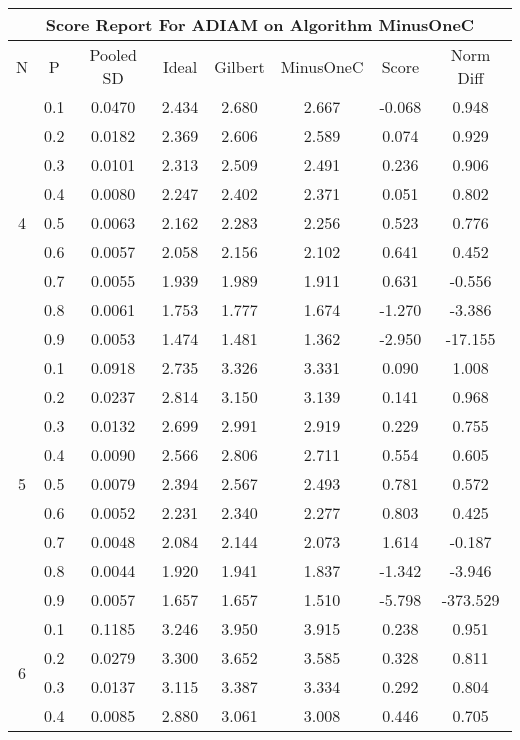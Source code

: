 \documentclass[11pt,a4paper]{report}
\begin{document}
\begin{longtable}{ | c | c || c | c | c | c | c | c | }
\hline
\multicolumn{8}{|c|}{ Score Report For ADIAM on Algorithm MinusOneC} \\
\hline
N & P & Pooled SD &  Ideal &  Gilbert & MinusOneC  & Score & Norm Diff \\
 \hline
 \hline
 \endhead
\multirow{9}{*}{4} & 0.1 & 0.0470 & 2.434 & 2.680 & 2.667 & -0.068 & 0.948 \\
 & 0.2 & 0.0182 & 2.369 & 2.606 & 2.589 & 0.074 & 0.929 \\
 & 0.3 & 0.0101 & 2.313 & 2.509 & 2.491 & 0.236 & 0.906 \\
 & 0.4 & 0.0080 & 2.247 & 2.402 & 2.371 & 0.051 & 0.802 \\
 & 0.5 & 0.0063 & 2.162 & 2.283 & 2.256 & 0.523 & 0.776 \\
 & 0.6 & 0.0057 & 2.058 & 2.156 & 2.102 & 0.641 & 0.452 \\
 & 0.7 & 0.0055 & 1.939 & 1.989 & 1.911 & 0.631 & -0.556 \\
 & 0.8 & 0.0061 & 1.753 & 1.777 & 1.674 & -1.270 & -3.386 \\
 & 0.9 & 0.0053 & 1.474 & 1.481 & 1.362 & -2.950 & -17.155 \\
 \hline
\multirow{9}{*}{5} & 0.1 & 0.0918 & 2.735 & 3.326 & 3.331 & 0.090 & 1.008 \\
 & 0.2 & 0.0237 & 2.814 & 3.150 & 3.139 & 0.141 & 0.968 \\
 & 0.3 & 0.0132 & 2.699 & 2.991 & 2.919 & 0.229 & 0.755 \\
 & 0.4 & 0.0090 & 2.566 & 2.806 & 2.711 & 0.554 & 0.605 \\
 & 0.5 & 0.0079 & 2.394 & 2.567 & 2.493 & 0.781 & 0.572 \\
 & 0.6 & 0.0052 & 2.231 & 2.340 & 2.277 & 0.803 & 0.425 \\
 & 0.7 & 0.0048 & 2.084 & 2.144 & 2.073 & 1.614 & -0.187 \\
 & 0.8 & 0.0044 & 1.920 & 1.941 & 1.837 & -1.342 & -3.946 \\
 & 0.9 & 0.0057 & 1.657 & 1.657 & 1.510 & -5.798 & -373.529 \\
 \hline
\multirow{9}{*}{6} & 0.1 & 0.1185 & 3.246 & 3.950 & 3.915 & 0.238 & 0.951 \\
 & 0.2 & 0.0279 & 3.300 & 3.652 & 3.585 & 0.328 & 0.811 \\
 & 0.3 & 0.0137 & 3.115 & 3.387 & 3.334 & 0.292 & 0.804 \\
 & 0.4 & 0.0085 & 2.880 & 3.061 & 3.008 & 0.446 & 0.705 \\

\end{longtable}
\end{document}
